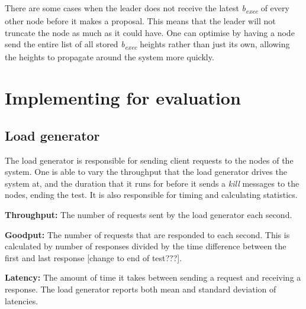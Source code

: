 There are some cases when the leader does not receive the latest \textit{b\textsubscript{exec}} of every other node before it makes a proposal. This means that the leader will not truncate the node as much as it could have. One can optimise by having a node send the entire list of all stored \textit{b\textsubscript{exec}} heights rather than just its own, allowing the heights to propagate around the system more quickly.



\section{Implementing for evaluation} \label{benchcode}
\subsection{Load generator}
The load generator is responsible for sending client requests to the nodes of the system. One is able to vary the throughput that the load generator drives the system at, and the duration that it runs for before it sends a \textit{kill} messages to the nodes, ending the test. It is also responsible for timing and calculating statistics.

\textbf{Throughput: } The number of requests sent by the load generator each second.

\textbf{Goodput: } The number of requests that are responded to each second. This is calculated by number of responses divided by the time difference between the first and last response [change to end of test???].

\textbf{Latency: } The amount of time it takes between sending a request and receiving a response. The load generator reports both mean and standard deviation of latencies.

